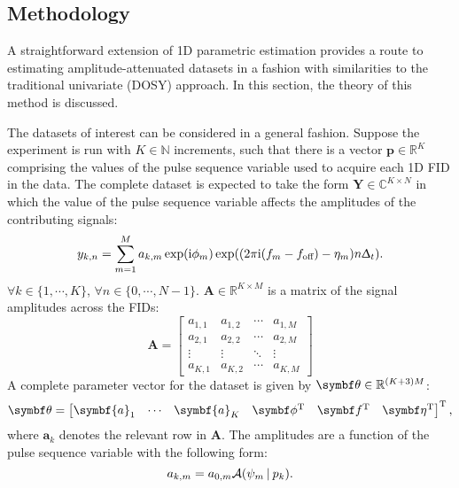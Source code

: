 \subsection{Methodology}
A straightforward extension of \ac{1D} parametric estimation
provides a route to estimating amplitude-attenuated datasets in a
fashion with similarities to the traditional univariate (\ac{DOSY}) approach.
In this section, the theory of this method is discussed.

The datasets of interest can be considered in a general fashion.
Suppose the experiment is run with $K \in \mathbb{N}$ increments,
such that there is a vector  $\symbf{p} \in \mathbb{R}^K$ comprising the
values of the pulse sequence variable used to acquire each \ac{1D} \ac{FID} in
the data.  The complete dataset is expected to take the form $\symbf{Y} \in
\mathbb{C}^{K \times N}$ in which the value of the pulse sequence variable
affects the amplitudes of the contributing signals:
\begin{equation}
    y_{k,n} = \sum_{m=1}^{M} a_{k,m} \exp(\mathrm{i} \phi_m)
    \exp((2 \pi \mathrm{i} (f_m - f_{\text{off}}) - \eta_m) n \Updelta_t).
\end{equation}
$\forall k \in \lbrace 1, \cdots, K \rbrace$, $\forall n \in \lbrace 0,
\cdots, N-1 \rbrace$.
$\symbf{A} \in \mathbb{R}^{K \times M}$ is a matrix of the signal amplitudes
across the \acp{FID}:
\begin{equation}
    \symbf{A} =
    \begin{bmatrix}
        a_{1,1} & a_{1,2} & \cdots & a_{1,M}\\
        a_{2,1} & a_{2,2} & \cdots & a_{2,M}\\
        \vdots & \vdots & \ddots & \vdots\\
        a_{K,1} & a_{K,2} & \cdots & a_{K,M}
    \end{bmatrix}
\end{equation}
A complete parameter vector for the dataset is given by $\bth \in
\mathbb{R}^{(K + 3)M}$:
\begin{equation}
    \bth =
    \begin{bmatrix}
        \symbf{a}_1 & \cdots & \symbf{a}_K & \bdphi\T & \bdf\T & \bdeta\T
    \end{bmatrix}\T,
\end{equation}
where $\symbf{a}_k$ denotes the relevant row in $\symbf{A}$.
The amplitudes are a function of the pulse sequence variable with the following
form:
\begin{equation}
    a_{k,m} = a_{0,m} \mathcal{A} (\psi_m \hspace*{2pt} | \hspace*{2pt} p_k).
\end{equation}
